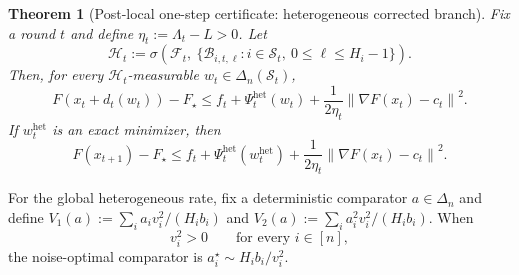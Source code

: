 \documentclass{article}
\newtheorem{theorem}{Theorem}[section]
\theoremstyle{definition}
\newcommand{\norm}[1]{\left\lVert #1\right\rVert}
\begin{document}
\begin{theorem}[Post-local one-step certificate: heterogeneous corrected branch]
\label{th:realized-het-one-step}
Fix a round $t$ and define $\eta_t:=\Lambda_t-L>0$. Let
\[
\mathcal H_t
:=
\sigma\!\left(
\mathcal F_t,\ \{\mathcal B_{i,t,\ell}:i\in\mathcal S_t,\ 0\le \ell\le H_i-1\}
\right).
\]
Then, for every $\mathcal H_t$-measurable $w_t\in\Delta_n(\mathcal S_t)$,
\begin{equation}
F(x_t+d_t(w_t))-F_\star
\le
f_t+\Psi_t^{\mathrm{het}}(w_t)+\frac{1}{2\eta_t}\norm{\nabla F(x_t)-c_t}^2.
\label{eq:realized-het-pathwise}\end{equation}
If $w_t^{\mathrm{het}}$ is an exact minimizer, then
\[
F(x_{t+1})-F_\star\le f_t+\Psi_t^{\mathrm{het}}(w_t^{\mathrm{het}})+\frac{1}{2\eta_t}\norm{\nabla F(x_t)-c_t}^2.
\]
\end{theorem}
For the global heterogeneous rate, fix a deterministic comparator $a\in\Delta_n$ and define $V_1(a):=\sum_i a_i v_i^2/(H_i b_i)$ and $V_2(a):=\sum_i a_i^2 v_i^2/(H_i b_i)$. When
\begin{equation}
v_i^2>0\qquad\text{for every }i\in[n],
\label{eq:realized-het-positive-v}
\end{equation}
the noise-optimal comparator is $a_i^\star\sim H_i b_i/v_i^2$.
\end{document}
